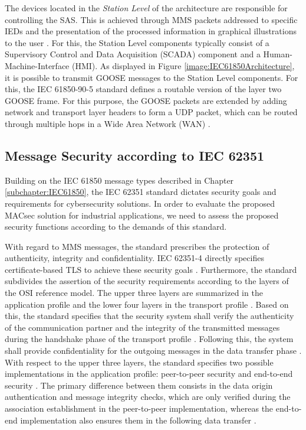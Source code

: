 \documentclass[conference, onecolumn, a4paper]{IEEEtran}
\begin{document}
\smallskip
The devices located in the \textit{Station Level} of the architecture are responsible for controlling the SAS. This is achieved through MMS packets 
addressed to specific IEDs and the presentation of the processed information in graphical illustrations to the user \cite{SGRWin_IEC61850Architecture:2021}. 
For this, the Station Level components typically consist of a Supervisory Control and Data Acquisition (SCADA) component and a Human-Machine-Interface 
(HMI). As displayed in Figure \ref{image:IEC61850Architecture}, it is possible to transmit GOOSE messages to the Station Level components. 
For this, the IEC 61850-90-5 standard \cite{IEC61850-90-5:2012} defines a routable version of the layer two GOOSE frame. For this purpose, the GOOSE 
packets are extended by adding network and transport layer headers to form a UDP packet, which can be routed through multiple hops in a Wide Area Network 
(WAN) \cite{routable_GOOSE_SV:2020}.

\subsection{Message Security according to IEC 62351}
\noindent Building on the IEC 61850 message types described in Chapter \ref{subchapter:IEC61850}, the IEC 62351 standard \cite{IEC62351:2024} dictates 
security goals and requirements for cybersecurity solutions. In order to evaluate the proposed MACsec solution for industrial applications, 
we need to assess the proposed security functions according to the demands of this standard.

\smallskip
With regard to MMS messages, the standard prescribes the protection of authenticity, integrity and confidentiality. IEC 62351-4 directly specifies 
certificate-based TLS to achieve these security goals \cite{SecureMMS:2020}. Furthermore, the standard subdivides the assertion of the security requirements 
according to the layers of the OSI reference model. The upper three layers are summarized in the application profile and the lower four layers in the 
transport profile \cite{SecureMMS:2020}. Based on this, the standard specifies that the security system shall verify the authenticity of the communication 
partner and the integrity of the transmitted messages during the handshake phase of the transport profile \cite{Review_IEC62351:2019}. Following this, 
the system shall provide confidentiality for the outgoing messages in the data transfer phase \cite{SecureMMS:2020}. With respect to the upper three 
layers, the standard specifies two possible implementations in the application profile: peer-to-peer security and end-to-end security 
\cite{Review_IEC62351:2019}. The primary difference between them consists in the data origin authentication and message integrity checks, which are only 
verified during the association establishment in the peer-to-peer implementation, whereas the end-to-end implementation also ensures them in the following 
data transfer \cite{Review_IEC62351:2019}.
\end{document}
